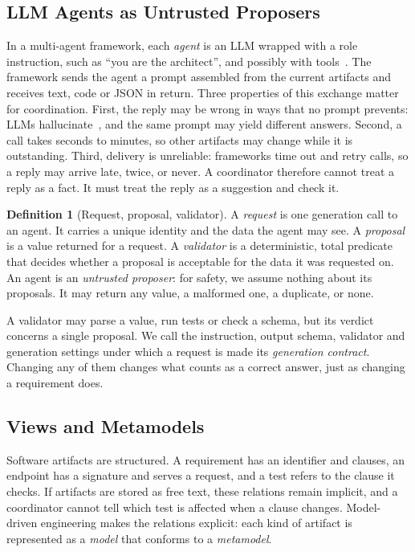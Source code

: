 \documentclass[10pt,journal,compsoc]{IEEEtran}
\theoremstyle{plain}
\theoremstyle{definition}
\newtheorem{definition}{Definition}
\begin{document}
\subsection{LLM Agents as Untrusted Proposers}\label{sec:bg-agents}
In a multi-agent framework, each \emph{agent} is an LLM wrapped with a role instruction, such as ``you are the architect'', and possibly with tools~\cite{metagpt,chatdev,autogen}. The framework sends the agent a prompt assembled from the current artifacts and receives text, code or JSON in return. Three properties of this exchange matter for coordination. First, the reply may be wrong in ways that no prompt prevents: LLMs hallucinate~\cite{ji2023hallucination}, and the same prompt may yield different answers. Second, a call takes seconds to minutes, so other artifacts may change while it is outstanding. Third, delivery is unreliable: frameworks time out and retry calls, so a reply may arrive late, twice, or never. A coordinator therefore cannot treat a reply as a fact. It must treat the reply as a suggestion and check it.

\begin{definition}[Request, proposal, validator]\label{def:proposal}
A \emph{request} is one generation call to an agent. It carries a unique identity and the data the agent may see. A \emph{proposal} is a value returned for a request. A \emph{validator} is a deterministic, total predicate that decides whether a proposal is acceptable for the data it was requested on. An agent is an \emph{untrusted proposer}: for safety, we assume nothing about its proposals. It may return any value, a malformed one, a duplicate, or none.
\end{definition}

A validator may parse a value, run tests or check a schema, but its verdict concerns a single proposal. We call the instruction, output schema, validator and generation settings under which a request is made its \emph{generation contract}. Changing any of them changes what counts as a correct answer, just as changing a requirement does.

\subsection{Views and Metamodels}\label{sec:bg-views}
Software artifacts are structured. A requirement has an identifier and clauses, an endpoint has a signature and serves a request, and a test refers to the clause it checks. If artifacts are stored as free text, these relations remain implicit, and a coordinator cannot tell which test is affected when a clause changes. Model-driven engineering makes the relations explicit: each kind of artifact is represented as a \emph{model} that conforms to a \emph{metamodel}.
\end{document}
